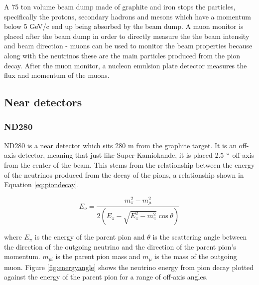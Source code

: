 A 75 ton volume beam dump made of graphite and iron stops the particles, specifically the protons, secondary hadrons and mesons which have a momentum below 5 GeV/c end up being absorbed by the beam dump. A muon monitor is placed after the beam dump in order to directly measure the the beam intensity and beam direction - muons can be used to monitor the beam properties because along with the neutrinos these are the main particles produced from the pion decay. After the muon monitor, a nucleon emulsion plate detector measures the flux and momentum of the muons. 

\subsection{Near detectors}

\subsubsection{ND280}

ND280 is a near detector which sits 280 m from the graphite target. It is an off-axis detector, meaning that just like Super-Kamiokande, it is placed 2.5 $\degree$ off-axis from the center of the beam. This stems from the relationship between the energy of the neutrinos produced from the decay of the pions, a relationship shown in Equation \ref{eq:piondecay}. 

\begin{equation}
    E_{\nu}=\frac{m_{\pi}^{2}-m_{\mu}^{2}}{2\left(E_{\pi}-\sqrt{E_{\pi}^{2}-m_{\pi}^{2}} \cos \theta\right)}
\label{eq:piondecay}
\end{equation}

where $E_{\pi}$ is the energy of the parent pion and $\theta$ is the scattering angle between the direction of the outgoing neutrino and the direction of the parent pion's momentum. $m_{pi}$ is the parent pion mass and $m_{\mu}$ is the mass of the outgoing muon. Figure \ref{fig:energyangle} shows the neutrino energy from pion decay plotted against the energy of the parent pion for a range of off-axis angles. 

